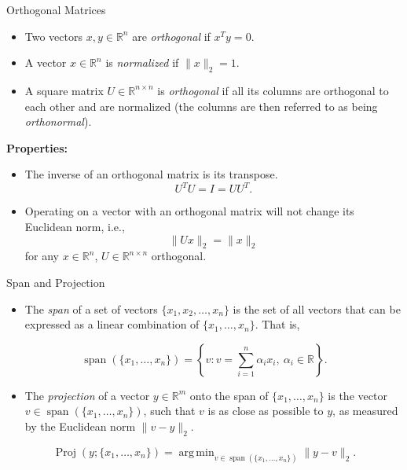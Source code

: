 \documentclass[aspectratio=169,12pt]{beamer}
\DeclareMathOperator*{\argmin}{arg\,min}
\DeclareMathOperator{\spanop}{span}
\DeclareMathOperator{\Proj}{Proj}
\begin{document}
\begin{frame}[t]{Orthogonal Matrices}
  \vspace{-0.10cm}
  {\scriptsize
  \begin{itemize}
    \setlength{\itemsep}{0.12cm}
    \item Two vectors $x,y\in\mathbb{R}^{n}$ are \emph{orthogonal} if $x^Ty=0$.
    \item A vector $x\in\mathbb{R}^{n}$ is \emph{normalized} if $\|x\|_2=1$.
    \item A square matrix $U\in\mathbb{R}^{n\times n}$ is \emph{orthogonal} if all
          its columns are orthogonal to each other and are normalized (the columns
          are then referred to as being \emph{orthonormal}).
  \end{itemize}
  \vspace{0.08cm}
  \textbf{Properties:}
  \begin{itemize}
    \setlength{\itemsep}{0.13cm}
    \item The inverse of an orthogonal matrix is its transpose.
      \[
        U^TU=I=UU^T.
      \]
    \item Operating on a vector with an orthogonal matrix will not change its
          Euclidean norm, i.e.,
      \[
        \|Ux\|_2=\|x\|_2
      \]
      for any $x\in\mathbb{R}^{n}$, $U\in\mathbb{R}^{n\times n}$ orthogonal.
  \end{itemize}
  }
\end{frame}

\begin{frame}[t]{Span and Projection}
  \vspace{-0.10cm}
  {\scriptsize
  \begin{itemize}
    \setlength{\itemsep}{0.20cm}
    \item The \emph{span} of a set of vectors $\{x_1,x_2,\ldots,x_n\}$ is the set
          of all vectors that can be expressed as a linear combination of
          $\{x_1,\ldots,x_n\}$. That is,
  \end{itemize}
  \[
    \spanop(\{x_1,\ldots,x_n\})
    =\left\{v:v=\sum_{i=1}^{n}\alpha_i x_i,\ \alpha_i\in\mathbb{R}\right\}.
  \]
  \begin{itemize}
    \setlength{\itemsep}{0.10cm}
    \item The \emph{projection} of a vector $y\in\mathbb{R}^{m}$ onto the span of
          $\{x_1,\ldots,x_n\}$ is the vector
          $v\in\spanop(\{x_1,\ldots,x_n\})$, such that $v$ is as close as possible
          to $y$, as measured by the Euclidean norm $\|v-y\|_2$.
  \end{itemize}
  \[
    \Proj(y;\{x_1,\ldots,x_n\})
    =\argmin_{v\in\spanop(\{x_1,\ldots,x_n\})}\|y-v\|_2.
  \]
  }
\end{frame}
\end{document}
